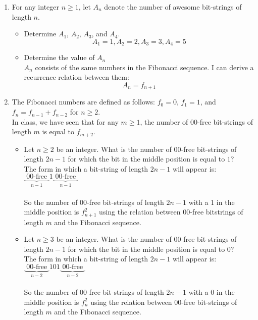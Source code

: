 \documentclass{article}
\begin{document}
\begin{enumerate}
		\item %
			For any integer $n \geq 1$, let $A_n$ denote the number of awesome bit-strings of length $n$. 
			\begin{itemize} 
				\item
					Determine $A_1$, $A_2$, $A_3$, and $A_4$. \\
					\[
						A_1 = 1, A_2 = 2, A_3 = 3, A_4 = 5 	
					\]
				\item
					Determine the value of $A_n$ \\
					$A_n$ consists of the same numbers in the Fibonacci sequence. I can derive a recurrence relation between them:
					\[
						A_n = f_{n + 1}
					\]
			\end{itemize}
		\item %
			The Fibonacci numbers are defined as follows: $f_0 = 0$, $f_1 = 1$, and $f_n = f_{n-1} + f_{n-2}$ for $n \geq 2$. \\
			In class, we have seen that for any $m \geq 1$, the number of $00$-free bit-strings of length $m$ is equal to $f_{m+2}$. \\
			\begin{itemize}
				\item
					Let $n \geq 2$ be an integer. What is the number of $00$-free bit-strings of length $2n - 1$ for which the bit in the middle position is equal to $1$? \\
					The form in which a bit-string of length $2n - 1$ will appear is: $\underbrace{\text{ 00-free }}_{n - 1} 1 \underbrace{\text{ 00-free }}_{n - 1}$ \\
					\\
					So the number of 00-free bit-strings of length $2n - 1$ with a 1 in the middle position is $f_{n + 1}^2$ using the relation between 00-free bitstrings of length $m$ and the Fibonacci sequence. \\
				\item
					Let $n \geq 3$ be an integer. What is the number of $00$-free bit-strings of length $2n - 1$ for which the bit in the middle position is equal to $0$? \\
					The form in which a bit-string of length $2n - 1$ will appear is: $\underbrace{\text{ 00-free }}_{n - 2} 101 \underbrace{\text{ 00-free }}_{n - 2}$ \\
					\\
					So the number of 00-free bit-strings of length $2n - 1$ with a 0 in the middle position is $f_{n}^2$ using the relation between 00-free bit-strings of length $m$ and the Fibonacci sequence. \\

\end{itemize}
\end{enumerate}
\end{document}
